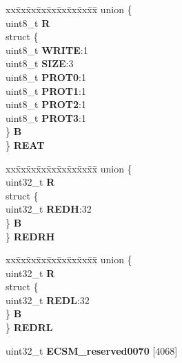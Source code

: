 \begin{DoxyCompactItemize}
\begin{tabbing}
\end{tabbing}\item 
\mbox{\label{structECSM__tag_a3d22445a1f84fbf13dda33282b893985}} 
\begin{tabbing}
xx\=xx\=xx\=xx\=xx\=xx\=xx\=xx\=xx\=\kill
union \{\\
\>uint8\_t {\bfseries R}\\
\>struct \{\\
\>\>uint8\_t {\bfseries WRITE}:1\\
\>\>uint8\_t {\bfseries SIZE}:3\\
\>\>uint8\_t {\bfseries PROT0}:1\\
\>\>uint8\_t {\bfseries PROT1}:1\\
\>\>uint8\_t {\bfseries PROT2}:1\\
\>\>uint8\_t {\bfseries PROT3}:1\\
\>\} {\bfseries B}\\
\} {\bfseries REAT}\\

\end{tabbing}\item 
\mbox{\label{structECSM__tag_a5880f2a5684b13841b845e0a13ef557c}} 
\begin{tabbing}
xx\=xx\=xx\=xx\=xx\=xx\=xx\=xx\=xx\=\kill
union \{\\
\>uint32\_t {\bfseries R}\\
\>struct \{\\
\>\>uint32\_t {\bfseries REDH}:32\\
\>\} {\bfseries B}\\
\} {\bfseries REDRH}\\

\end{tabbing}\item 
\mbox{\label{structECSM__tag_a7d20c2f9ad2b8827afb2dee035a3f226}} 
\begin{tabbing}
xx\=xx\=xx\=xx\=xx\=xx\=xx\=xx\=xx\=\kill
union \{\\
\>uint32\_t {\bfseries R}\\
\>struct \{\\
\>\>uint32\_t {\bfseries REDL}:32\\
\>\} {\bfseries B}\\
\} {\bfseries REDRL}\\

\end{tabbing}\item 
\mbox{\label{structECSM__tag_a133d4cd9f346e7fac1604e0ebddded29}} 
uint32\+\_\+t {\bfseries E\+C\+S\+M\+\_\+reserved0070} \mbox{[}4068\mbox{]}
\end{DoxyCompactItemize}


